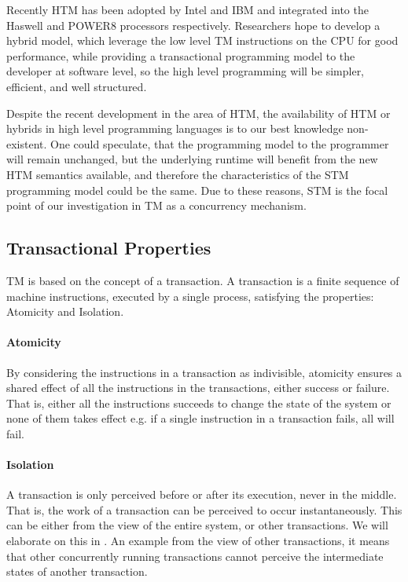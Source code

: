 Recently \ac{HTM} has been adopted by Intel and IBM and integrated into the Haswell and POWER8 processors respectively\cite{Anthes:2014:RSP:2684442.2667109}. Researchers hope to develop a hybrid model, which leverage the low level \ac{TM} instructions on the \ac{CPU} for good performance, while providing a transactional programming model to the developer at software level, so the high level programming will be simpler, efficient, and well structured\cite{Anthes:2014:RSP:2684442.2667109}.

Despite the recent development in the area of \ac{HTM}, the availability of \ac{HTM} or hybrids in high level programming languages is to our best knowledge non-existent. One could speculate, that the programming model to the programmer will remain unchanged, but the underlying runtime will benefit from the new \ac{HTM} semantics available, and therefore the characteristics of the \ac{STM} programming model could be the same. Due to these reasons, \ac{STM} is the focal point of our investigation in \ac{TM} as a concurrency mechanism. 

\subsection{Transactional Properties}
\label{sec:stm_tm_properties}
\ac{TM} is based on the concept of a transaction. A transaction is a finite sequence of machine instructions, executed by a single process, satisfying the properties: Atomicity and Isolation\cite[p. 2]{herlihy2011tm}.

\paragraph{Atomicity} By considering the instructions in a transaction as indivisible, atomicity ensures a shared effect of all the instructions in the transactions, either success or failure. That is, either all the instructions succeeds to change the state of the system or none of them takes effect e.g. if a single instruction in a transaction fails, all will fail.
\paragraph{Isolation} A transaction is only perceived before or after its execution, never in the middle. That is, the work of a transaction can be perceived to occur instantaneously. This can be either from the view of the entire system, or other transactions. We will elaborate on this in . An example from the view of other transactions, it means that other concurrently running transactions cannot perceive the intermediate states of another transaction.

